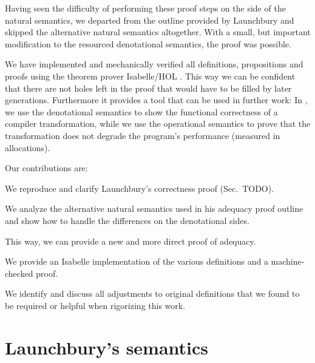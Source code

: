 \documentclass{jfp1}
\theoremstyle{nonumberbreak}
\begin{document}
Having seen the difficulty of performing these proof steps on the side of the natural semantics, we departed from the outline provided by Launchbury and skipped the alternative natural semantics altogether. With a small, but important modification to the resourced denotational semantics, the proof was possible.

We have implemented and mechanically verified all definitions, propositions and proofs using the theorem prover Isabelle/HOL \cite{afp}. This way we can be confident that there are not holes left in the proof that would have to be filled by later generations. Furthermore it provides a tool that can be used in further work: In \cite{callartiy-icfp}, we use the denotational semantics to show the functional correctness of a compiler transformation, while we use the operational semantics to prove that the transformation does not degrade the program’s performance (measured in allocations).


Our contributions are:
\begin{compactitem}
\item We reproduce and clarify Launchbury’s correctness proof (Sec.~TODO).
\item We analyze the alternative natural semantics used in his adequacy proof outline and show how to handle the differences on the denotational sides.
\item This way, we can provide a new and more direct proof of adequacy.
\item We provide an Isabelle implementation of the various definitions and a machine-checked proof.
\item We identify and discuss all adjustments to original definitions that we found to be required or helpful when rigorizing this work.
\end{compactitem}

\section{Launchbury's semantics}
\end{document}
